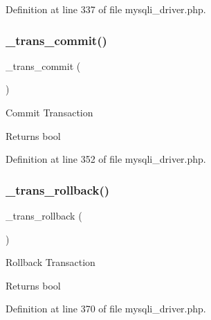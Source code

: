 Definition at line 337 of file mysqli\+\_\+driver.\+php.

\mbox{\label{class_c_i___d_b__mysqli__driver_a6fe7f373e0b11cfae23a5f41c0b35dda}} 
\subsubsection{\texorpdfstring{\_trans\_commit()}{\_trans\_commit()}}
{\footnotesize\ttfamily \+\_\+trans\+\_\+commit (\begin{DoxyParamCaption}{ }\end{DoxyParamCaption})\hspace{0.3cm}{\ttfamily [protected]}}

Commit Transaction

\begin{DoxyReturn}{Returns}
bool 
\end{DoxyReturn}


Definition at line 352 of file mysqli\+\_\+driver.\+php.

\mbox{\label{class_c_i___d_b__mysqli__driver_ad49a116b0776c26b53114c9093fd102a}} 
\subsubsection{\texorpdfstring{\_trans\_rollback()}{\_trans\_rollback()}}
{\footnotesize\ttfamily \+\_\+trans\+\_\+rollback (\begin{DoxyParamCaption}{ }\end{DoxyParamCaption})\hspace{0.3cm}{\ttfamily [protected]}}

Rollback Transaction

\begin{DoxyReturn}{Returns}
bool 
\end{DoxyReturn}


Definition at line 370 of file mysqli\+\_\+driver.\+php.

\mbox{\label{class_c_i___d_b__mysqli__driver_a77248aaad33eb132c04cc4aa3f4bc8cb}} 
